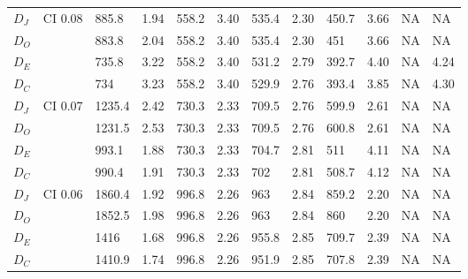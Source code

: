 \begin{table*}[h]
\begin{tabular}{|l|l|llllllllll|}
\hline
$D_J$   & \multirow{4}{*}{CI 0.08} &885.8        & 1.94          & 558.2        & 3.40          & 535.4        & 2.30         & 450.7        & 3.66        &      NA       &       NA      \\
$D_O$    &                           					& 883.8        & 2.04          & 558.2        & 3.40          & 535.4        & 2.30     & 451      & 3.66        &      NA       &   NA          \\
$D_E$ &                          					 & 735.8        & 3.22          & 558.2        & 3.40          & 531.2        & 2.79         & 392.7      & 4.40        &      NA       &   4.24          \\
$D_C$    &                          					 & 734        & 3.23          & 558.2        & 3.40          & 529.9        & 2.76         & 393.4      & 3.85        &     NA        &     4.30        \\
\hline
$D_J$   & \multirow{4}{*}{CI 0.07} & 1235.4       & 2.42          & 730.3        & 2.33          & 709.5        & 2.76         & 599.9      & 2.61       &      NA       &      NA       \\
$D_O$    &                           					& 1231.5       & 2.53          & 730.3        & 2.33          & 709.5        & 2.76         & 600.8        & 2.61        &      NA       &    NA         \\
$D_E$ &                           					& 993.1       & 1.88          & 730.3        & 2.33          & 704.7        & 2.81         & 511        & 4.11        &       NA      &    NA        \\
$D_C$    &                           					& 990.4       & 1.91          & 730.3        & 2.33          & 702          & 2.81         & 508.7      & 4.12        &    NA         &    NA        \\
\hline
$D_J$   & \multirow{4}{*}{CI 0.06} & 1860.4       & 1.92          & 996.8        & 2.26          & 963          & 2.84         & 859.2      & 2.20        &    NA         &  NA           \\
$D_O$    &                          					 & 1852.5       & 1.98          & 996.8        & 2.26          & 963        & 2.84         & 860      & 2.20        &       NA      &      NA       \\
$D_E$ &                           					& 1416       & 1.68          & 996.8        & 2.26          & 955.8        & 2.85         & 709.7      & 2.39        &      NA       &       NA      \\
$D_C$    &                        					   & 1410.9       & 1.74          & 996.8        & 2.26          & 951.9        & 2.85         & 707.8      & 2.39        &     NA        &   NA          \\

\end{tabular}
\end{table*}
